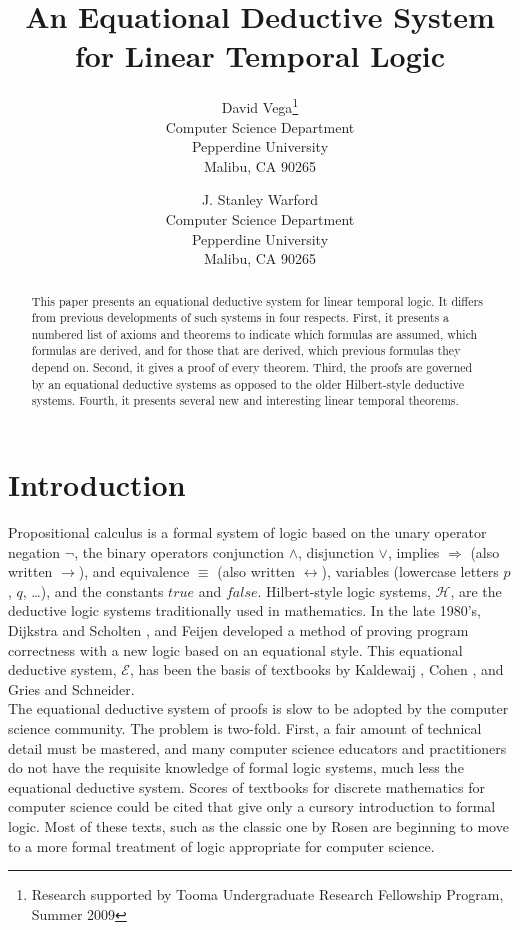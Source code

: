 \documentclass[fleqn, leqno]{article}
\title{An Equational Deductive System\\for Linear Temporal Logic}
\author{David Vega\thanks{Research supported by Tooma Undergraduate Research Fellowship Program, Summer 2009}\\
   Computer Science Department\\
   Pepperdine University\\
   Malibu, CA 90265
   \and
   J. Stanley Warford\\
   Computer Science Department\\
   Pepperdine University\\
   Malibu, CA 90265}
\date{} %
\newcommand{\impl}{\ensuremath{\Rightarrow}}        %
\begin{document}
\maketitle
\begin{abstract}
This paper presents an equational deductive system for linear temporal logic.
It differs from previous developments of such systems in four respects.
First, it presents a numbered list of axioms and theorems to indicate which formulas are assumed, which formulas are
derived, and for those that are derived, which previous formulas they depend on.
Second, it gives a proof of every theorem.
Third, the proofs are governed by an equational deductive systems as opposed to the older Hilbert-style deductive systems.
Fourth, it presents several new and interesting linear temporal theorems.\end{abstract}

\thispagestyle{plain}

\section{Introduction}

Propositional calculus is a formal system of logic based on the unary operator negation $\lnot$,
the binary operators conjunction $\land$, disjunction $\lor$, implies $\impl$ (also written $\rightarrow$),
and equivalence $\equiv$ (also written $\leftrightarrow$),
variables (lowercase letters $p$, $q$, \dots), and the constants $true$ and $false$.
Hilbert-style logic systems, $\mathcal{H}$, are the deductive logic systems traditionally used in mathematics.
In the late 1980's, Dijkstra and Scholten \cite{DandS}, and Feijen \cite{Feij} developed a method of proving
program correctness with a new logic based on an equational style.
This equational deductive system, $\mathcal{E}$, has been the basis of textbooks by Kaldewaij \cite{Kald},
Cohen \cite{Cohen}, and Gries and Schneider\cite{LADM}.\\

The equational deductive system of proofs is slow to be adopted by the computer science community.
The problem is two-fold.
First, a fair amount of technical detail must be mastered,
and many computer science educators and practitioners do not have the requisite
knowledge of formal logic systems, much less the equational deductive system.
Scores of textbooks for discrete mathematics for computer science could be cited that give only a cursory introduction to
formal logic. Most of these texts, such as the classic one by Rosen \cite{Rosen} are beginning to move to a more
formal treatment of logic appropriate for computer science.\\
\end{document}
